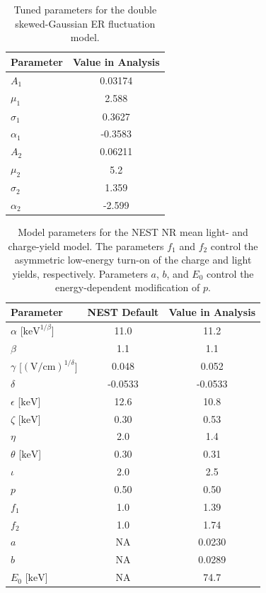 \begin{table}[ht]
    \centering
    \caption{Tuned parameters for the double skewed-Gaussian ER fluctuation model.}
    \begin{tabular}{lc}
        \hline\hline
        Parameter & Value in Analysis \\
        \hline
        $A_1$      & 0.03174 \\
        $\mu_1$    & 2.588 \\
        $\sigma_1$ & 0.3627 \\
        $\alpha_1$ & -0.3583 \\
        \hline
        $A_2$      & 0.06211 \\
        $\mu_2$    & 5.2 \\
        $\sigma_2$ & 1.359 \\
        $\alpha_2$ & -2.599 \\
        \hline\hline
    \end{tabular}
    \label{tab:eft2024_er_double_gaussian_parameters}
\end{table}

\begin{table}[ht]
    \centering
    \caption{
        Model parameters for the NEST NR mean light- and charge-yield model.
        The parameters $f_1$ and $f_2$ control the asymmetric low-energy
        turn-on of the charge and light yields, respectively. Parameters $a$, $b$, and $E_0$ control the energy-dependent modification of $p$.
    }
    \begin{tabular}{lcc}
        \hline\hline
        Parameter & NEST Default & Value in Analysis \\
        \hline
        $\alpha$ [$\mathrm{keV}^{1/\beta}$] & 11.0 & 11.2 \\
        $\beta$ & 1.1 & 1.1 \\
        $\gamma$ [$(\mathrm{V/cm})^{1/\delta}$] & 0.048 & 0.052 \\
        $\delta$ & -0.0533 & -0.0533 \\
        $\epsilon$ [$\mathrm{keV}$] & 12.6 & 10.8 \\
        $\zeta$ [$\mathrm{keV}$] & 0.30 & 0.53 \\
        $\eta$ & 2.0 & 1.4 \\
        $\theta$ [$\mathrm{keV}$] & 0.30 & 0.31 \\
        $\iota$ & 2.0 & 2.5 \\
        $p$ & 0.50 & 0.50 \\
        \hline
        $f_1$ & 1.0 & 1.39 \\
        $f_2$ & 1.0 & 1.74 \\
                \hline
        $a$ & NA & 0.0230 \\
        $b$ & NA &  0.0289 \\
        $E_0$ [$\mathrm{keV}$] & NA & 74.7 \\
        \hline\hline
    \end{tabular}
    \label{tab:eft2024_nr_yield_parameters}
\end{table}

